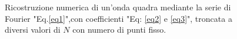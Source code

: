 \documentclass[10pt,a4paper]{article}
\begin{document}
\begin{figure}[H]
\vspace{-0.3cm}
    \vspace{-0.3cm}

  
    
\caption{Ricostruzione numerica di un'onda quadra mediante la serie di Fourier "Eq.\ref{eq1}",con coefficienti "Eq: \ref{eq2} e \ref{eq3}", troncata a diversi valori di \(N\) con numero di punti fisso.}  
\label{fig:imgN}  
\end{figure}  
\end{document}
